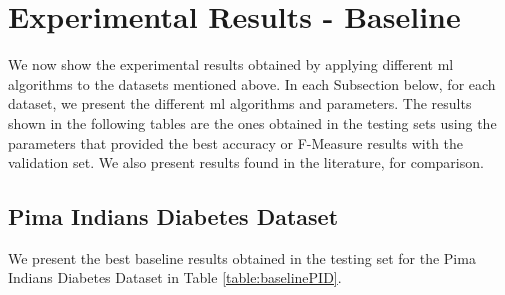 \section{Experimental Results - Baseline}
\label{sec:ExperimentalResultsBaseline}


We now show the experimental results obtained by applying different \ac{ml} algorithms to the datasets mentioned above. In each Subsection below, for each dataset, we present the different \ac{ml} algorithms and parameters. The results shown in the following tables are the ones obtained in the testing sets using the parameters that provided the best accuracy or F-Measure results with the validation set. We also present results found in the literature, for comparison.

\subsection{Pima Indians Diabetes Dataset}

We present the best baseline results obtained in the testing set for the Pima Indians Diabetes Dataset in Table \ref{table:baselinePID}.

